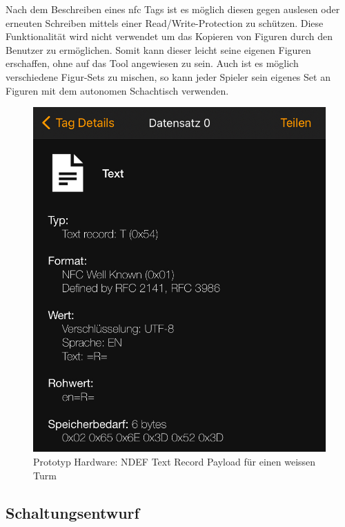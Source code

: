 Nach dem Beschreiben eines \gls{nfc} Tags ist es möglich diesen gegen
auslesen oder erneuten Schreiben mittels einer Read/Write-Protection zu
schützen. Diese Funktionalität wird nicht verwendet um das Kopieren von
Figuren durch den Benutzer zu ermöglichen. Somit kann dieser leicht
seine eigenen Figuren erschaffen, ohne auf das Tool angewiesen zu sein.
Auch ist es möglich verschiedene Figur-Sets zu mischen, so kann jeder
Spieler sein eigenes Set an Figuren mit dem autonomen Schachtisch
verwenden.

\begin{figure}
\centering
\includegraphics{images/ndef_record_rook.png}
\caption{Prototyp Hardware: NDEF Text Record Payload für einen weissen
Turm}
\end{figure}

\hypertarget{schaltungsentwurf}{%
\subsection{Schaltungsentwurf}\label{schaltungsentwurf}}

